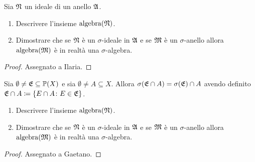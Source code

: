 \documentclass[../EserciziIstituzioniAnalisi.tex]{subfiles}
\begin{document}
\begin{exercise}
  
\end{exercise}

\begin{exercise}[13/10/2016]
Sia $\mathfrak N$ un ideale di un anello $\mathfrak A$.
\begin{enumerate}
\item Descrivere l'insieme $\operatorname{algebra}(\mathfrak N)$.
\item Dimostrare che se $\mathfrak N$ \`e un $\sigma$-ideale in $\mathfrak A$ e se $\mathfrak M$ \`e un $\sigma$-anello allora $\operatorname{algebra}(\mathfrak M)$ \`e in realt\`a una $\sigma$-algebra.
\end{enumerate}
\end{exercise}
\begin{proof}
  Assegnato a Ilaria.
\end{proof}

\begin{exercise}[2016-10-13]
Sia $\emptyset \neq \mathfrak E \subseteq \mathbb P(X)$ e sia $\emptyset \neq A \subseteq X$.
Allora $\sigma(\mathfrak E \cap A) = \sigma(\mathfrak E) \cap A$ avendo definito $\mathfrak E \cap A \coloneqq \left\lbrace E \cap A \colon E \in \mathfrak E\right\rbrace$.
\begin{enumerate}
\item Descrivere l'insieme $\operatorname{algebra}(\mathfrak N)$.
\item Dimostrare che se $\mathfrak N$ \`e un $\sigma$-ideale in $\mathfrak A$ e se $\mathfrak M$ \`e un $\sigma$-anello allora $\operatorname{algebra}(\mathfrak M)$ \`e in realt\`a una $\sigma$-algebra.
\end{enumerate}
\end{exercise}
\begin{proof}
Assegnato a Gaetano.
\end{proof}
\end{document}
